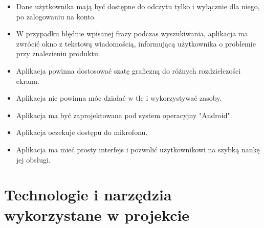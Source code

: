 \documentclass[12pt, a4paper]{article}
\begin{document}
\begin{sloppypar}
{{    \begin{itemize}
      \item Dane użytkownika mają być dostępne do odczytu tylko i wyłącznie dla niego, po 
      zalogowaniu na konto.
      \item W przypadku błędnie wpisanej frazy podczas wyszukiwania, aplikacja ma 
      zwrócić okno z tekstową wiadomością, informującą użytkownika o problemie przy
      znalezieniu produktu.
      \item Aplikacja powinna dostosować szatę graficzną do różnych rozdzielczości ekranu.
      \item Aplikacja nie powinna móc działać w tle i wykorzystywać zasoby.
      \item Aplikacja ma być zaprojektowana pod system operacyjny "Android".
      \item Aplikacja oczekuje dostępu do mikrofonu. 
      \item Aplikacja ma mieć prosty interfejs i pozwolić użytkownikowi na szybką naukę
      jej obsługi.
    \end{itemize}
  }
}

\section{Technologie i narzędzia wykorzystane w projekcie}
{

}
\end{sloppypar}
\end{document}
